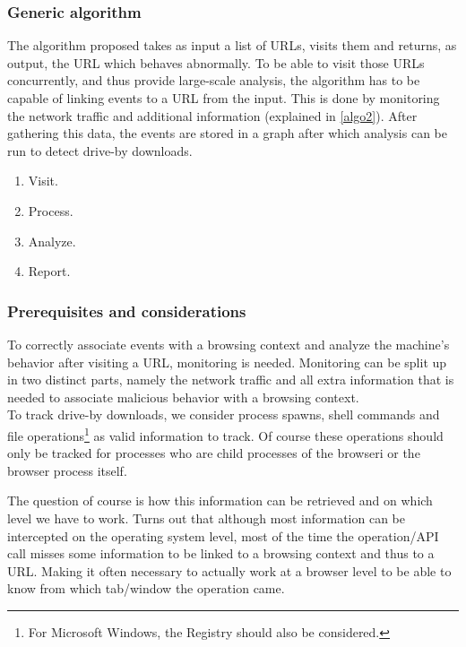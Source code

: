 
\subsubsection{Generic algorithm}

The algorithm proposed takes as input a list of URLs, visits them and returns, as output, the URL which behaves abnormally. To be able to visit those URLs concurrently, and thus provide large-scale analysis, the algorithm has to be capable of linking events to a URL from the input. This is done by monitoring the network traffic and additional information (explained in \ref{algo2}). After gathering this data, the events are stored in a graph after which analysis can be run to detect drive-by downloads.

\begin{enumerate}
\item Visit.
\item Process.
\item Analyze.
\item Report.
\end{enumerate}

\subsubsection{Prerequisites and considerations}

To correctly associate events with a browsing context and analyze the machine's behavior after visiting a URL, monitoring is needed. Monitoring can be split up in two distinct parts, namely the network traffic and all extra information that is needed to associate malicious behavior with a browsing context.\\

To track drive-by downloads, we consider process spawns, shell commands and file operations\footnote{For Microsoft Windows, the Registry should also be considered.} as valid information to track. Of course these operations should only be tracked for processes who are child processes of the browseri or the browser process itself.\\

The question of course is how this information can be retrieved and on which level we have to work. Turns out that although most information can be intercepted on the operating system level, most of the time the operation/API call misses some information to be linked to a browsing context and thus to a URL. Making it often necessary to actually work at a browser level to be able to know from which tab/window the operation came.%



